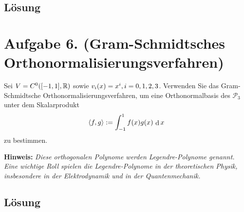 \documentclass[german,12pt]{homework}
\newcommand{\RR}{\mathbb{R}}
\newcommand{\dotproduct}[2]{\left\langle#1, #2\right\rangle}
\newcommand{\dd}{\,\differ}
\DeclareMathOperator{\differ}{d}
\DeclarePairedDelimiter{\enbrace}{(}{)}
\DeclarePairedDelimiter{\benbrace}{[}{]}
\begin{document}
    \subsection*{Lösung}

    \section*{Aufgabe 6. (Gram-Schmidtsches Orthonormalisierungsverfahren)}

    \begin{problem}
        Sei \(V = C^0\enbrace*{\benbrace*{-1, 1}, \RR}\) sowie \(v_i\enbrace*{x} = x^i, i = 0, 1, 2, 3\). Verwenden Sie das Gram-Schmidtsche Orthonormalisierungsverfahren, um eine Orthonormalbasis des \(\mathcal{P}_3\) unter dem Skalarprodukt
        \[\dotproduct{f}{g} := \int_{-1}^1f\enbrace*{x}g\enbrace*{x}\dd{x}\]
        zu bestimmen.

        \textbf{Hinweis:} \emph{Diese orthogonalen Polynome werden Legendre-Polynome genannt. Eine wichtige Roll spielen die Legendre-Polynome in der theoretischen Physik, insbesondere in der Elektrodynamik und in der Quantenmechanik.}
    \end{problem}

    \subsection*{Lösung}
\end{document}
